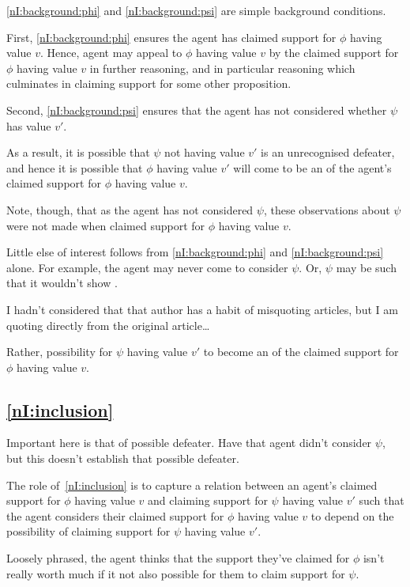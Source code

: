 \begin{note}
\ref{nI:background:phi} and \ref{nI:background:psi} are simple background conditions.

First, \ref{nI:background:phi} ensures the agent has claimed support for \(\phi\) having value \(v\).
Hence, agent may appeal to \(\phi\) having value \(v\) by the claimed support for \(\phi\) having value \(v\) in further reasoning, and in particular reasoning which culminates in claiming support for some other proposition.

Second, \ref{nI:background:psi} ensures that the agent has not considered whether \(\psi\) has value \(v'\).

As a result, it is possible that \(\psi\) not having value \(v'\) is an unrecognised defeater, and hence it is possible that \(\phi\) having value \(v'\) will come to be an \expec{} of the agent's claimed support for \(\phi\) having value \(v\).

Note, though, that as the agent has not considered \(\psi\), these observations about \(\psi\) were not made when claimed support for \(\phi\) having value \(v\).

Little else of interest follows from \ref{nI:background:phi} and \ref{nI:background:psi} alone.
For example, the agent may never come to consider \(\psi\).
Or, \(\psi\) may be such that it wouldn't show \mom{}.

I hadn't considered that that author has a habit of misquoting articles, but I am quoting directly from the original article\dots

Rather, possibility for \(\psi\) having value \(v'\) to become an \expec{} of the claimed support for \(\phi\) having value \(v\).
\end{note}

\subsection{\ref{nI:inclusion}}

\begin{note}
  Important here is that of possible defeater.
  Have that agent didn't consider \(\psi\), but this doesn't establish that possible defeater.
\end{note}

\begin{note}
  The role of~\ref{nI:inclusion} is to capture a relation between an agent's claimed support for \(\phi\) having value \(v\) and claiming support for \(\psi\) having value \(v'\) such that the agent considers their claimed support for \(\phi\) having value \(v\) to depend on the possibility of claiming support for \(\psi\) having value \(v'\).

  Loosely phrased, the agent thinks that the support they've claimed for \(\phi\) isn't really worth much if it not also possible for them to claim support for \(\psi\).
\end{note}



